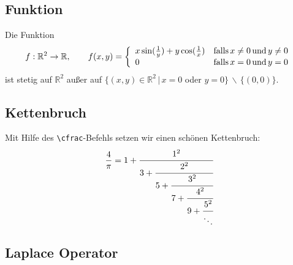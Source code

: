 \documentclass{article}
\newcommand{\R}{\mathbb{R}}
\begin{document}
\subsection{Funktion}

Die Funktion
%
\begin{equation*}
    f: \R^2 \rightarrow \R, \qquad f(x,y) = \left\{ \begin{array}{ll}
         x \sin ({1 \over y}) + y \cos ({1 \over x}) & \text{falls} \, x \neq 0 \, \text{und} \, y \neq 0 \\
         0 & \text{falls} \, x = 0 \, \text{und} \, y = 0
    \end{array} \right.
\end{equation*}
%
ist stetig auf $\R^2$ außer auf $\{(x,y) \in \R^2 \, | \, x = 0$ oder $y = 0\} \, \backslash \, \{(0,0)\}$.

\subsection{Kettenbruch}

Mit Hilfe des \texttt{\textbackslash cfrac}-Befehls setzen wir einen schönen Kettenbruch:
%
\begin{equation*}
    {4 \over \pi} = 1 + \cfrac{1^2}{3 + \cfrac{2^2}{5 + \cfrac{3^2}{7 + \cfrac{4^2}{9+\cfrac{5^2}{\ddots}}}}}
\end{equation*}
%

\clearpage

\subsection{Laplace Operator}
\end{document}
